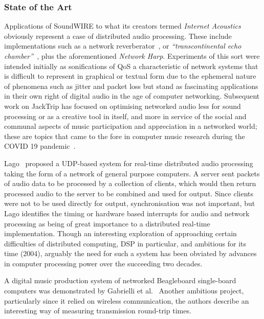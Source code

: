 \subsubsection{State of the Art}

Applications of SoundWIRE to what its creators termed \textit{Internet
Acoustics}~\citep{chafe_physical_2002} obviously represent a case of distributed
audio processing.
These include implementations such as a network
reverberator~\citep{chafe_i_2018}, or
\textit{``transcontinental echo chamber''}~\citep{chafe_simplified_2000},
plus the aforementioned \textit{Network Harp}.
Experiments of this sort were intended initially as sonifications of QoS
\textemdash{} a characteristic of network systems that is difficult to represent
in graphical or textual form due to the ephemeral nature of phenomena such as
jitter and packet loss \textemdash{} but stand as fascinating applications in
their own right of digital audio in the age of computer networking.
Subsequent work on JackTrip has focused on optimising networked audio less
for sound processing or as a creative tool in itself, and more in service of
the social and communal aspects of music participation and appreciation in a
networked world;
these are topics that came to the fore in computer music research during the
COVID 19 pandemic~\citep{bosi_experiencing_2021,sacchetto_jacktrip-webrtc_2021}.

Lago~\citep{lago_distributed_2004} proposed a UDP-based system for real-time
distributed audio processing taking the form of a network of general purpose
computers.
A server sent packets of audio data to be processed by a collection of
clients, which would then return processed audio to the server to be combined
and used for output.
Since clients were not to be used directly for output, synchronisation was not
important, but Lago identifies the timing or hardware based interrupts for
audio and network processing as being of great importance to a distributed
real-time implementation.
Though an interesting exploration of approaching certain difficulties of
distributed computing, DSP in particular, and ambitious for its time (2004),
arguably the need for such a system has been obviated by advances in computer
processing power over the succeeding two decades.

A digital music production system of networked Beagleboard single-board
computers was demonstrated by Gabrielli et al.~\citep{gabrielli_networked_2012}
Another ambitious project, particularly since it relied on wireless
communication, the authors describe an interesting way of measuring
transmission round-trip times.

